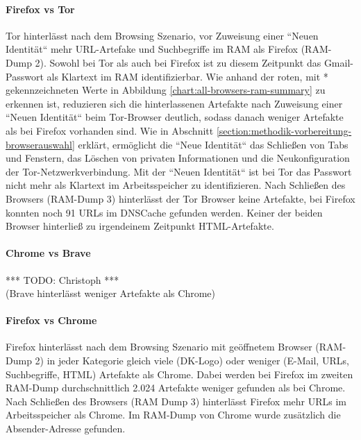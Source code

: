 \paragraph*{Firefox vs Tor}
Tor hinterlässt nach dem Browsing Szenario, vor Zuweisung einer ``Neuen Identität`` mehr URL-Artefake und Suchbegriffe im RAM als Firefox (RAM-Dump 2). 
Sowohl bei Tor als auch bei Firefox ist zu diesem Zeitpunkt das Gmail-Passwort als Klartext im RAM identifizierbar.
Wie anhand der roten, mit * gekennzeichneten Werte in Abbildung \ref{chart:all-browsers-ram-summary} zu erkennen ist, 
reduzieren sich die hinterlassenen Artefakte nach Zuweisung einer ``Neuen Identität`` beim Tor-Browser deutlich, sodass danach weniger Artefakte als bei Firefox vorhanden sind.
Wie in Abschnitt \ref{section:methodik-vorbereitung-browserauswahl} erklärt, ermöglicht die ``Neue Identität`` das Schließen von Tabs und Fenstern, das Löschen von privaten Informationen und die Neukonfiguration der Tor-Netzwerkverbindung.
Mit der ``Neuen Identität`` ist bei Tor das Passwort nicht mehr als Klartext im Arbeitsspeicher zu identifizieren.
Nach Schließen des Browsers (RAM-Dump 3) hinterlässt der Tor Browser keine Artefakte, bei Firefox konnten noch 91 URLs im DNSCache gefunden werden. 
Keiner der beiden Browser hinterließ zu irgendeinem Zeitpunkt HTML-Artefakte.

\paragraph*{Chrome vs Brave}
*** TODO: Christoph ***\\
(Brave hinterlässt weniger Artefakte als Chrome)

\paragraph*{Firefox vs Chrome}
Firefox hinterlässt nach dem Browsing Szenario mit geöffnetem Browser (RAM-Dump 2) in jeder Kategorie gleich viele (DK-Logo) oder weniger (E-Mail, URLs, Suchbegriffe, HTML) Artefakte als Chrome.
Dabei werden bei Firefox im zweiten RAM-Dump durchschnittlich 2.024 Artefakte weniger gefunden als bei Chrome.
Nach Schließen des Browsers (RAM Dump 3) hinterlässt Firefox mehr URLs im Arbeitsspeicher als Chrome. Im RAM-Dump von Chrome wurde zusätzlich die Absender-Adresse gefunden.


